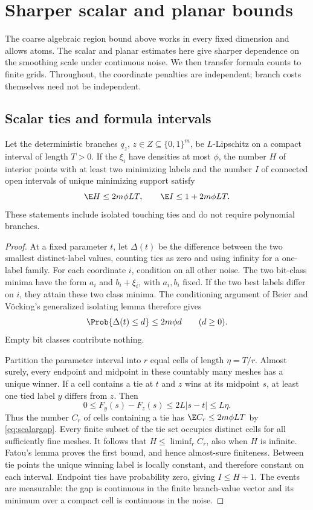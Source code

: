 \section{Sharper scalar and planar bounds}\label{sec:geometry}
The coarse algebraic region bound above works in every fixed dimension and
allows atoms. The scalar and planar estimates here give sharper dependence
on the smoothing scale under continuous noise. We then transfer formula
counts to finite grids. Throughout, the coordinate penalties are independent;
branch costs themselves need not be independent.

\subsection{Scalar ties and formula intervals}
\begin{theorem}\label{thm:scalar}
Let the deterministic branches $q_z$, $z\in Z\subseteq\{0,1\}^m$, be
$L$-Lipschitz on a compact interval of length $T>0$. If the $\xi_i$ have
densities at most $\phi$, the number $H$ of interior points with at least
two minimizing labels and the number $I$ of connected open intervals of
unique minimizing support satisfy
\[
 \E H\le2m\phi LT,\qquad \E I\le1+2m\phi LT.
\]
These statements include isolated touching ties and do not require polynomial
branches.
\end{theorem}
\begin{proof}
At a fixed parameter $t$, let $\Delta(t)$ be the difference between the two
smallest distinct-label values, counting ties as zero and using infinity for
a one-label family. For each coordinate $i$, condition on all other noise.
The two bit-class minima have the form $a_i$ and $b_i+\xi_i$, with
$a_i,b_i$ fixed. If the two best labels differ on $i$, they attain these
two class minima. The conditioning argument of Beier and V\"ocking's generalized
isolating lemma \cite[conference version, Lemma~5]{BeierVocking} therefore gives
\begin{equation}\label{eq:scalargap}
 \Prob\{\Delta(t)\le d\}\le2m\phi d\qquad(d\ge0).
\end{equation}
Empty bit classes contribute nothing.

Partition the parameter interval into $r$ equal cells of length $\eta=T/r$.
Almost surely, every endpoint and midpoint in these countably many meshes
has a unique winner. If a cell contains a tie at $t$ and $z$ wins at its
midpoint $s$, at least one tied label $y$ differs from $z$. Then
\[
 0\le F_y(s)-F_z(s)\le2L|s-t|\le L\eta.
\]
Thus the number $C_r$ of cells containing a tie has
$\E C_r\le2m\phi LT$ by \eqref{eq:scalargap}. Every finite subset of
the tie set occupies distinct cells for all sufficiently fine meshes.
It follows that $H\le\liminf_r C_r$, also when $H$ is infinite. Fatou's
lemma proves the first bound, and hence almost-sure finiteness. Between tie
points the unique winning label is locally constant, and therefore constant
on each interval. Endpoint ties have probability zero, giving $I\le H+1$.
The events are measurable: the gap is continuous in the finite branch-value
vector and its minimum over a compact cell is continuous in the noise.
\end{proof}

